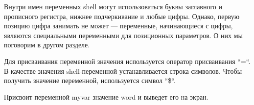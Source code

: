 Внутри имен переменных shell могут использоваться буквы заглавного и прописного регистра, нижнее подчеркивание и любые цифры. Однако, первую позицию цифра занимать не может --- переменные, начинающиеся с цифры, являются специальными переменными для позиционных параметров. О них мы поговорим в другом разделе.

Для присваивания переменной значения используется оператор присваивания “=“. В качестве значения shell-переменной устанавливается строка символов. Чтобы получить значение переменной, используется символ “\$“.

		
Присвоит переменной myvar значение word и выведет его на экран.

